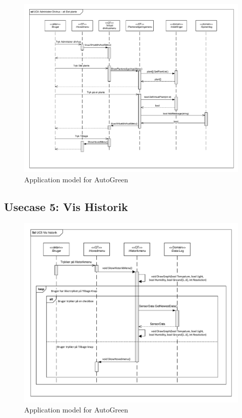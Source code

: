\clearpage

\begin{figure}[!h]
\centering 
\includegraphics[width={\textwidth-1cm}, trim=0 0 0 0, clip=true] {../fig/SD_autoGreen_UC_4_Administrerdrivhus_alt_sletplante.pdf}
\caption{Application model for AutoGreen}
\label{fig:SD_UC1_alt2}
\end{figure}

\clearpage

\subsection{Usecase 5: Vis Historik}

\begin{figure}[!h]
\centering 
\includegraphics[width={\textwidth-1cm}, trim=0 0 0 0, clip=true] {../fig/SD_autogreen_UC_5_Vis_historik.pdf}
\caption{Application model for AutoGreen}
\label{fig:SD_UC5}
\end{figure}

